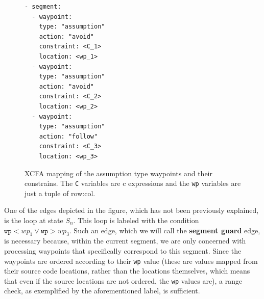 \begin{figure}[htbp]
  \centering
  \begin{minipage}[t]{0.25\textwidth}
    \begin{lstlisting}[style=c, columns=flexibl]
- segment:
  - waypoint:
    type: "assumption"
    action: "avoid"
    constraint: <C_1>
    location: <wp_1>
  - waypoint:
    type: "assumption"
    action: "avoid"
    constraint: <C_2>
    location: <wp_2>
  - waypoint:
    type: "assumption"
    action: "follow"
    constraint: <C_3>
    location: <wp_3>
    \end{lstlisting}
    \end{minipage}
  \caption{XCFA mapping of the assumption type waypoints and their constrains. The \texttt{C}
  variables are c expressions and the \texttt{wp} variables are just a tuple of row:col.}
  \label{fig:map assumtion}
\end{figure}

One of the edges depicted in the figure, which has not been previously explained, is the loop at 
state $S_n$. This loop is labeled with the condition $\texttt{wp} < wp_1 \lor \texttt{wp} > wp_3$. Such 
an edge, which we will call the \textbf{segment guard} edge, is necessary because, within the current 
segment, we are only concerned with processing waypoints that specifically correspond to this segment. 
Since the waypoints are ordered according to their \texttt{wp} value (these are values mapped from their 
source code locations, rather than the locations themselves, which means that even if the source locations 
are not ordered, the \texttt{wp} values are), a range check, as exemplified by the aforementioned label, 
is sufficient.

